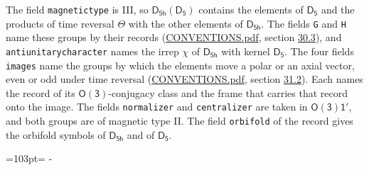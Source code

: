 \documentclass[10pt,a4paper]{article}
\newcommand{\needspace}[1]{\par\penalty-100\begingroup\dimen0=#1\relax\dimen2=\pagegoal
  \advance\dimen2-\pagetotal\ifdim\dimen0>\dimen2\relax\ifdim\dimen2>0pt\vfil\break\fi\fi
  \endgroup}
\numberwithin{equation}{section}
\newcommand{\grp}[1]{\mathsf{#1}}
\begin{document}
The field \texttt{magnetictype} is III, so $\grp{D_{5h}}(\grp{D_{5}})$ contains the elements of $\grp{D_{5}}$ and the products of time reversal $\varTheta$ with the other elements of $\grp{D_{5h}}$. The fields \texttt{G} and \texttt{H} name these groups by their records (\href{../../CONVENTIONS.pdf}{CONVENTIONS.pdf}, section \href{../../CONVENTIONS.pdf\#conv.30.3}{30.3}), and \texttt{antiunitarycharacter} names the irrep $\chi$ of $\grp{D_{5h}}$ with kernel $\grp{D_{5}}$. The four fields \texttt{images} name the groups by which the elements move a polar or an axial vector, even or odd under time reversal (\href{../../CONVENTIONS.pdf}{CONVENTIONS.pdf}, section \href{../../CONVENTIONS.pdf\#conv.31.2}{31.2}). Each names the record of its $\grp{O(3)}$-conjugacy class and the frame that carries that record onto the image. The fields \texttt{normalizer} and \texttt{centralizer} are taken in $\grp{O(3)1'}$, and both groups are of magnetic type II. The field \texttt{orbifold} of the record gives the orbifold symbols of $\grp{D_{5h}}$ and of $\grp{D_{5}}$.
\needspace{103pt}
\end{document}
